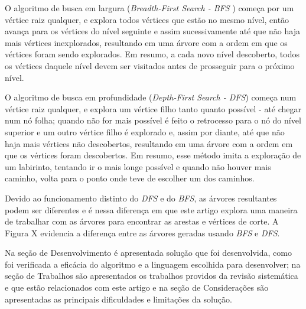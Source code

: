 \documentclass[
	article,
	12pt,
	openright,
	oneside,
	a4paper,
	english,
	french,
	spanish,
	brazil
	]{abntex2}
\begin{document}
O algoritmo de busca em largura (\textit{Breadth-First Search - BFS} ) começa por um vértice raiz qualquer, e explora todos vértices que estão no mesmo nível, então avança para os vértices do nível seguinte e assim sucessivamente até que não haja mais vértices inexplorados, resultando em uma árvore com a ordem em que os vértices foram sendo explorados. Em resumo, a cada novo nível descoberto, todos os vértices daquele nível devem ser visitados antes de prosseguir para o próximo nível.

O algoritmo de busca em profundidade (\textit{Depth-First Search - DFS}) começa num vértice raiz qualquer, e explora um vértice filho tanto quanto possível - até chegar num nó folha; quando não for mais possível é feito o retrocesso para o nó do nível superior e um outro vértice filho é explorado e, assim por diante, até que não haja mais vértices não descobertos, resultando em uma árvore com a ordem em que os vértices foram descobertos. Em resumo, esse método imita a exploração de um labirinto, tentando ir o mais longe possível e quando não houver mais caminho, volta para o ponto onde teve de escolher um dos caminhos.

Devido ao funcionamento distinto do \textit{DFS} e do \textit{BFS}, as árvores resultantes podem ser diferentes e é nessa diferença em que este artigo explora uma maneira de trabalhar com as árvores para encontrar as arestas e vértices de corte. A Figura X evidencia a diferença entre as árvores geradas usando \textit{BFS} e \textit{DFS}.

Na seção de Desenvolvimento é apresentada solução que foi desenvolvida,  como foi verificada a eficácia do algoritmo e a linguagem escolhida para desenvolver; na seção de Trabalhos são apresentados os trabalhos providos da revisão sistemática e que estão relacionados com este artigo e na seção de Considerações são apresentadas as principais dificuldades e limitações da solução.
\end{document}
